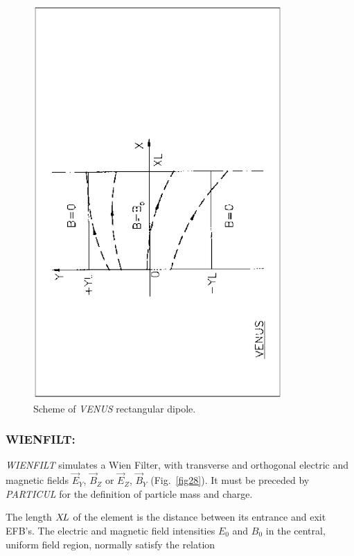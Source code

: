 \vfill
\begin{figure}[H]
\centerline{\includegraphics[height=15cm,angle=-90]{Fig32.ps}}
\caption{\label{fig32}Scheme of \textsl{VENUS} rectangular dipole.}
\end{figure}
\vfill

\newpage

\subsubsection*{WIENFILT: \WIENFILTTitl}\label{WIENFILT} 

\textsl{WIENFILT} simulates a Wien Filter, with transverse and
orthogonal electric and magnetic fields $ \vec  E_Y$,  $ \vec  B_Z $ or $ \vec  E_Z$, 
 $ \vec  B_Y$ (Fig.~\ref{fig28}).
 It must be preceded by \textsl{PARTICUL} for the definition of particle mass and charge.  
\bigskip

\noindent The length $ X\!L $ of the element is the distance between its
entrance and exit EFB's. The electric and magnetic field intensities $ E_0 $ and $ B_0 $ in the 
central, uniform field region, normally satisfy the relation
 
